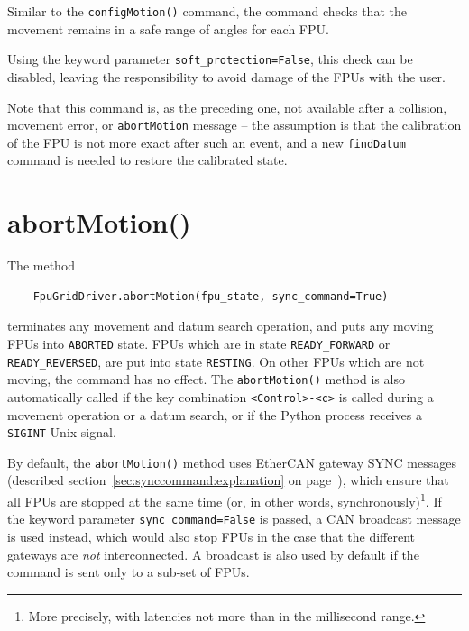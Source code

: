 \documentclass[fontsize=12,a4paper]{scrreprt}
\begin{document}
Similar to the \texttt{configMotion()} command, the command checks
that the movement remains in a safe range of angles for each
FPU.

Using the keyword parameter \texttt{soft\_protection=False}, this
check can be disabled, leaving the responsibility to avoid damage of
the FPUs with the user.

Note that this command is, as the preceding one, not available after a
collision, movement error, or \texttt{abortMotion} message -- the
assumption is that the calibration of the FPU is not more exact after
such an event, and a new \texttt{findDatum} command is needed to
restore the calibrated state.


\section{abortMotion()}
\label{sec:abortMotion}


\begin{sloppypar}
  The method

  \begin{verbatim}
    FpuGridDriver.abortMotion(fpu_state, sync_command=True)
  \end{verbatim}
terminates any movement and datum search operation, and puts any
moving FPUs into \texttt{ABORTED} state. FPUs which are in state
\texttt{READY\_FORWARD} or \texttt{READY\_REVERSED}, are put into
state \texttt{RESTING}.  On other FPUs which are not moving, the
command has no effect.  The \texttt{abortMotion()} method is also
automatically called if the key combination \verb+<Control>-<c>+ is
called during a movement operation or a datum search, or if the Python
process receives a \texttt{SIGINT} Unix signal.
\end{sloppypar}

%
%
%
%
%
%
By default, the \texttt{abortMotion()} method uses EtherCAN gateway
SYNC messages (described section~\ref{sec:synccommand:explanation} on
page~\pageref{sec:synccommand:explanation}), which ensure that all
FPUs are stopped at the same time (or, in other words,
synchronously)\footnote{More precisely, with latencies not more than
  in the millisecond range.}.  If the keyword parameter
\texttt{sync\_command=False} is passed, a CAN broadcast message is
used instead, which would also stop FPUs in the case that the
different gateways are \emph{not} interconnected. A broadcast is also
used by default if the command is sent only to a sub-set of FPUs.
\end{document}
